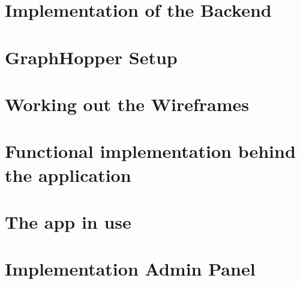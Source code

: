 \section{Implementation of the Backend}


\section{GraphHopper Setup}


\section{Working out the Wireframes}


\section{Functional implementation behind the application}


\section{The app in use}


\section{Implementation Admin Panel}


%